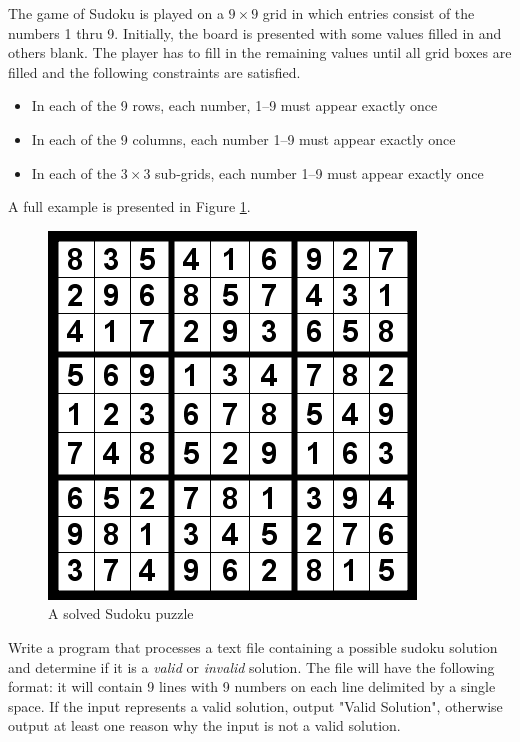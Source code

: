 \begin{exer}
The game of Sudoku is played on a $9 \times 9$ grid in which
entries consist of the numbers 1 thru 9.  Initially, the board is 
presented with some values filled in and others blank.  The player 
has to fill in the remaining values until all grid boxes are filled and
the following constraints are satisfied.
\begin{itemize}
  \item In each of the 9 rows, each number, 1--9 must appear exactly once
  \item In each of the 9 columns, each number 1--9 must appear exactly once
  \item In each of the $3 \times 3$ sub-grids, each number 1--9 must appear exactly once
\end{itemize}
A full example is presented in Figure \ref{fig:sudoku01}.
\begin{figure}[h]
\centering
\includegraphics[scale=0.40]{images/sudoku01.png}
\caption{A solved Sudoku puzzle}
\label{fig:sudoku01}
\end{figure}

Write a program that processes a text file containing a possible 
sudoku solution and determine if it is a \emph{valid} or \emph{invalid} 
solution.  The file will have the following format: it will contain 9 lines 
with 9 numbers on each line delimited by a single space.  If the input 
represents a valid solution, output "Valid Solution", otherwise output at 
least one reason why the input is not a valid solution.
\end{exer}

